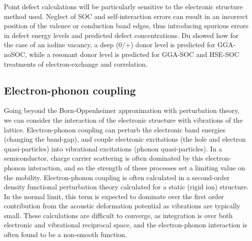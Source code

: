 
Point defect calculations will be particularly sensitive to the electronic structure method used.
Neglect of SOC and self-interaction errors can result in an incorrect position of the valence or conduction band edges, thus introducing spurious errors in defect energy levels and predicted defect concentrations.
Du\autocite{Du2015} showed how for the case of an iodine vacancy, a deep (0/+) donor level is predicted for GGA-noSOC,
while a resonant donor level is predicted for GGA-SOC and HSE-SOC treatments of electron-exchange and correlation.

\subsection{Electron-phonon coupling} \label{ch2epcoupling}

Going beyond the Born-Oppenheimer approximation with perturbation theory, we can consider the interaction of the electronic structure with vibrations of the lattice. 
Electron-phonon coupling can perturb the electronic band energies (changing the band-gap), and couple electronic excitations (the hole and electron quasi-particles) into vibrational excitations (phonon quasi-particles). 
In a semiconductor, charge carrier scattering is often dominated by this electron-phonon interaction, and so the strength of these processes set a limiting value on the mobility. 
Electron-phonon coupling is often calculated in a second-order density functional perturbation theory calculated for a static (rigid ion) structure.
In the normal limit, this term is expected to dominate over the first order contribution from the acoustic deformation potential as vibrations are typically small. 
These calculations are difficult to converge, as integration is over both electronic and vibrational reciprocal space, and the electron-phonon interaction is often found to be a non-smooth function.\autocite{RevModPhys.89.015003}

